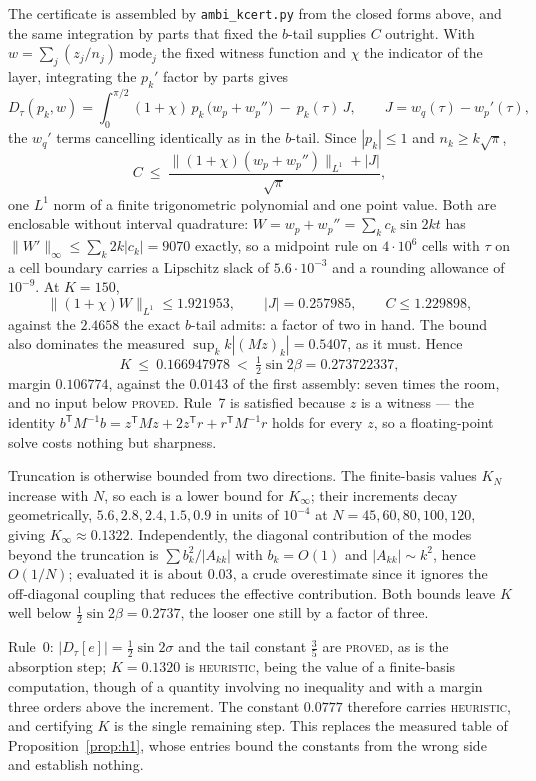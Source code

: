 \documentclass[11pt]{article}
\theoremstyle{definition}
\begin{document}
The certificate is assembled by \texttt{ambi\_kcert.py} from the closed forms above, and
the same integration by parts that fixed the $b$-tail supplies $C$ outright. With
$w=\sum_j(z_j/n_j)\,\text{mode}_j$ the fixed witness function and $\chi$ the indicator of
the layer, integrating the $p_k'$ factor by parts gives
\[
  D_\tau(p_k,w)=\int_0^{\pi/2}(1+\chi)\,p_k\,\bigl(w_p+w_p''\bigr)\ -\ p_k(\tau)\,J ,
  \qquad J=w_q(\tau)-w_p'(\tau) ,
\]
the $w_q'$ terms cancelling identically as in the $b$-tail. Since $|p_k|\le1$ and
$n_k\ge k\sqrt\pi$,
\[
  C\ \le\ \frac{\bigl\|(1+\chi)(w_p+w_p'')\bigr\|_{L^1}+|J|}{\sqrt\pi} ,
\]
one $L^1$ norm of a finite trigonometric polynomial and one point value. Both are
enclosable without interval quadrature: $W=w_p+w_p''=\sum_k c_k\sin2kt$ has
$\|W'\|_\infty\le\sum_k2k|c_k|=9070$ exactly, so a midpoint rule on $4\cdot10^6$ cells with
$\tau$ on a cell boundary carries a Lipschitz slack of $5.6\cdot10^{-3}$ and a rounding
allowance of $10^{-9}$. At $K=150$,
\[
  \bigl\|(1+\chi)W\bigr\|_{L^1}\le1.921953,\qquad |J|=0.257985,\qquad C\le1.229898 ,
\]
against the $2.4658$ the exact $b$-tail admits: a factor of two in hand. The bound also
dominates the measured $\sup_{k}k|(Mz)_k|=0.5407$, as it must. Hence
\[
  K\ \le\ 0.166947978\ <\ \tfrac12\sin2\beta=0.273722337 ,
\]
margin $0.106774$, against the $0.0143$ of the first assembly: seven times the room, and no
input below \textsc{proved}. Rule~7 is satisfied because $z$ is a witness --- the identity
$b^{\mathsf T}M^{-1}b=z^{\mathsf T}Mz+2z^{\mathsf T}r+r^{\mathsf T}M^{-1}r$ holds for every
$z$, so a floating-point solve costs nothing but sharpness.

Truncation is otherwise bounded from two directions. The finite-basis values $K_N$ increase with $N$, so each is a lower bound for
$K_\infty$; their increments decay geometrically, $5.6,2.8,2.4,1.5,0.9$ in units of
$10^{-4}$ at $N=45,60,80,100,120$, giving $K_\infty\approx0.1322$. Independently, the
diagonal contribution of the modes beyond the truncation is $\sum b_k^2/|A_{kk}|$ with
$b_k=O(1)$ and $|A_{kk}|\sim k^2$, hence $O(1/N)$; evaluated it is about $0.03$, a crude
overestimate since it ignores the off-diagonal coupling that reduces the effective
contribution. Both bounds leave $K$ well below $\tfrac12\sin2\beta=0.2737$, the looser one
still by a factor of three.

Rule~0: $|D_\tau[e]|=\tfrac12\sin2\sigma$ and the tail constant $\tfrac35$ are
\textsc{proved}, as is the absorption step; $K=0.1320$ is \textsc{heuristic}, being the
value of a finite-basis computation, though of a quantity involving no inequality and with
a margin three orders above the increment. The constant $0.0777$ therefore carries
\textsc{heuristic}, and certifying $K$ is the single remaining step. This replaces the
measured table of Proposition~\ref{prop:h1}, whose entries bound the constants from the
wrong side and establish nothing.
\end{document}
